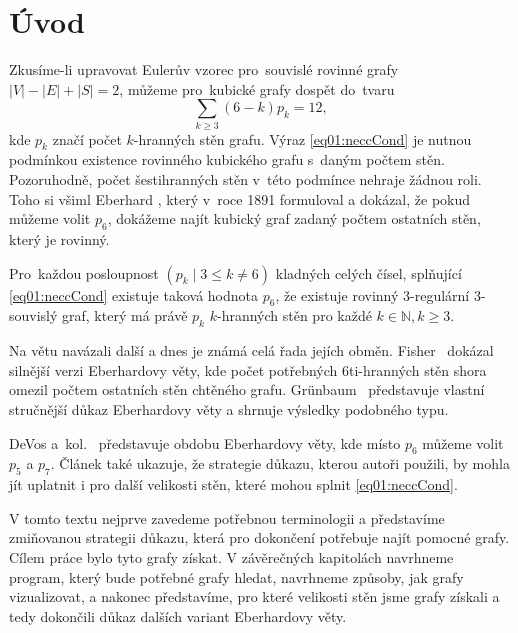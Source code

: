\chapter*{Úvod}

Zkusíme-li upravovat Eulerův vzorec pro~souvislé rovinné grafy
$|V|-|E|+|S|=2$, můžeme pro~kubické grafy dospět do~tvaru 
\begin{equation}\label{eq01:neccCond}
\sum_{k \geq 3}{(6-k)p_k}=12,
\end{equation}
kde $p_k$ značí počet $k$-hranných stěn grafu. Výraz \eqref{eq01:neccCond} je nutnou podmínkou existence rovinného kubického grafu s~daným počtem stěn. Pozoruhodně, počet šestihranných stěn v~této podmínce nehraje žádnou roli. Toho si všiml Eberhard \cite{Eberhard91}, který v~roce 1891 formuloval a dokázal, že pokud můžeme volit $p_6$, dokážeme najít kubický graf zadaný počtem ostatních stěn, který je rovinný.

\begin{veta}\label{veta:Eberhard}
Pro~každou posloupnost $(p_k \mid 3 \leq k \neq 6)$ kladných celých čísel, splňující \eqref{eq01:neccCond} existuje taková hodnota $p_6$, že existuje rovinný 3-regulární 3-souvislý graf, který má právě $p_k$ $k$-hranných stěn pro každé $k \in \mathbb{N}, k \geq 3 $.
\end{veta}

Na větu navázali další a dnes je známá celá řada jejích obměn. Fisher~\cite{Fisher74} dokázal silnější verzi Eberhardovy věty, kde počet potřebných 6ti-hranných stěn shora omezil počtem ostatních stěn chtěného grafu. Grünbaum~\cite{Grunbaum} představuje vlastní stručnější důkaz Eberhardovy věty a shrnuje výsledky podobného typu. 

DeVos a~kol.~\cite{Samal09} představuje obdobu Eberhardovy věty, kde místo $p_6$ můžeme volit $p_5$ a $p_7$. Článek také ukazuje, že strategie důkazu, kterou autoři použili, by mohla jít uplatnit i pro další velikosti stěn, které mohou splnit \eqref{eq01:neccCond}. 

V tomto textu nejprve zavedeme potřebnou terminologii a představíme zmiňovanou strategii důkazu, která pro dokončení potřebuje najít pomocné grafy. Cílem práce bylo tyto grafy získat. V závěrečných kapitolách navrhneme program, který bude potřebné grafy hledat, navrhneme způsoby, jak grafy vizualizovat, a nakonec představíme, pro které velikosti stěn jsme grafy získali a tedy dokončili důkaz dalších variant Eberhardovy věty.
